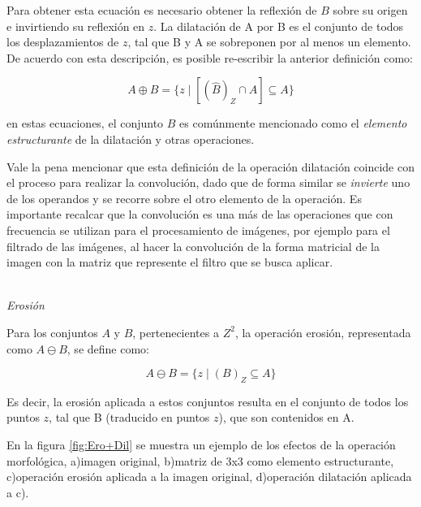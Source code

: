 Para obtener esta ecuación es necesario obtener la reflexión de $B$ sobre su origen e invirtiendo su reflexión en $z$. La dilatación de A por B es el conjunto de todos los desplazamientos de $z$, tal que B y A se sobreponen por al menos un elemento. De acuerdo con esta descripción, es posible re-escribir la anterior definición como:

\begin{equation}
A \oplus B = \{ z \mid [(\hat{B})_{Z} \cap A] \subseteq A \}
\label{eqn:dilatacion2}
\end{equation}

en estas ecuaciones, el conjunto $B$ es comúnmente mencionado como el \textit{elemento estructurante} de la dilatación y otras operaciones.

Vale la pena mencionar que esta definición de la operación dilatación coincide con el proceso para realizar la convolución, dado que de forma similar se \textit{invierte} uno de los operandos y se recorre sobre el otro elemento de la operación. Es importante recalcar que la convolución es una más de las operaciones que con frecuencia se utilizan para el procesamiento de imágenes, por ejemplo para el filtrado de las imágenes, al hacer la convolución de la forma matricial de la imagen con la matriz que represente el filtro que se busca aplicar. 

\phantom{holis}\\
\emph{Erosión}


Para los conjuntos $A$ y $B$, pertenecientes a $Z^{2}$, la operación erosión, representada como $A \ominus B$, se define como:

\begin{equation}
A \ominus B = \{ z \mid (B)_{Z} \subseteq A \}
\label{eqn:erosion}
\end{equation}

Es decir, la erosión aplicada a estos conjuntos resulta en el conjunto de todos los puntos $z$, tal que B (traducido en puntos $z$), que son contenidos en A.

En la figura \ref{fig:Ero+Dil} se muestra un ejemplo de los efectos de la operación morfológica, a)imagen original, b)matriz de 3x3 como elemento estructurante, c)operación erosión aplicada a la imagen original, d)operación dilatación aplicada a c).

